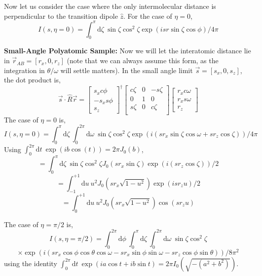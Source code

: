 \documentclass[fleqn,oneside,12pt]{article}
\begin{document}
Now let us consider the case where the only intermolecular distance is
perpendicular to the transition dipole $\hat z$. For the case of $\eta = 0$,
\[
I (s, \eta = 0)
=
\int_{0}^{\pi}
\mathrm{d} \zeta \
\sin \zeta
\cos^2 \zeta
\exp (
i 
s
r
\sin \zeta
\cos \phi
)
/ 4 \pi
\]

\textbf{Small-Angle Polyatomic Sample:} Now we will let the interatomic distance
lie in $\vec r_{AB} = [r_x, 0, r_z]$ (note that we can always assume this
form, as the integration in $\theta/\omega$ will settle matters). In the small
angle limit $\vec s = [s_x, 0, s_z]$, the dot product is,
\[
\vec s \cdot \hat R \vec r
=
\left [
\begin{array}{c}
s_{x} c \phi \\
- s_{x} s \phi \\
s_{z}
\end{array}
\right ]^{\dagger}
\left [
\begin{array}{ccc}
c \zeta & 0 & -s \zeta \\
0 & 1 & 0 \\
s \zeta & 0 & c \zeta \\
\end{array}
\right ]
\left [
\begin{array}{c}
r_{x} c \omega \\
r_{x} s \omega \\
r_{z}
\end{array}
\right ]
\]
The case of $\eta = 0$ is,
\[
I (s, \eta = 0)
=
\int_{0}^{\pi}
\mathrm{d} \zeta \
\int_{0}^{2 \pi}
\mathrm{d} \omega \
\sin \zeta
\cos^2 \zeta
\exp(i (
s r_x \sin \zeta \cos \omega 
+ 
s r_z \cos \zeta
))
/ 4 \pi
\]
Using $\int_{0}^{2 \pi} \mathrm{d} t \ \exp(i b \cos (t)) = 2 \pi J_{0} (b)$,
\[
=
\int_{0}^{\pi}
\mathrm{d} \zeta \
\sin \zeta
\cos^2 \zeta
J_{0} (s r_{x} \sin \zeta)
\exp(i (
s r_z \cos \zeta
))
/ 2
\]
\[
=
\int_{-1}^{+1}
\mathrm{d} u \
u^2
J_{0} (s r_{x} \sqrt{1 - u^2})
\exp (i s r_{z} u) 
/ 2
\]
\[
=
\int_{0}^{+1}
\mathrm{d} u \
u^2
J_{0} (s r_{x} \sqrt{1 - u^2})
\cos (s r_{z} u)
\]

The case of $\eta = \pi / 2$ is,
\[
I (s, \eta = \pi / 2)
=
\int_{0}^{2 \pi}
\mathrm{d} \phi \
\int_{0}^{\pi}
\mathrm{d} \zeta \
\int_{0}^{2 \pi}
\mathrm{d} \omega \
\sin \zeta
\cos^2 \zeta
\]
\[
\times
\exp (i (
s r_{x} \cos \phi \cos \theta \cos \omega
-
s r_{x} \sin \phi \sin \omega
-
s r_{z} \cos \phi \sin \theta
))
/ 8 \pi^2
\]
using the identity $\int_{0}^{2 \pi} \mathrm{d} t \ \exp(i a \cos t + i b \sin
t) = 2 \pi I_{0} (\sqrt{- (a^2 + b^2)})$.
\end{document}
